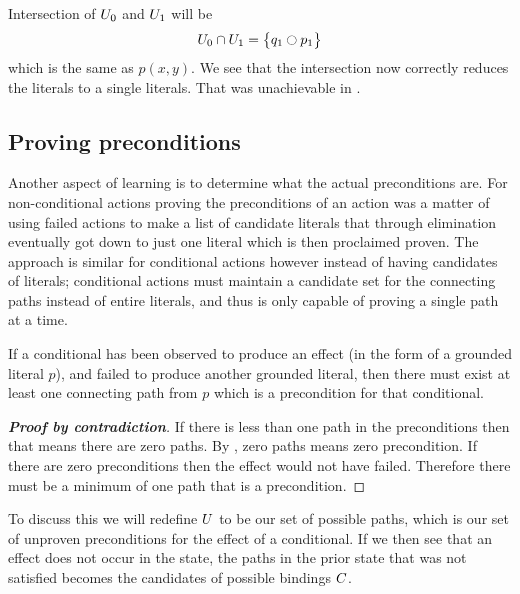\documentclass[\master/Master.tex]{subfiles}
\begin{document}
\begin{example}
   Intersection of $U_0$ and $U_1$ will be
	   \begin{align*}
	   	U_0 \cap U_1=
	   	\left\{
	   	\begin{gathered}
	   		q_1 \ocircle p_1 
	   	\end{gathered}	
	   	\right\}	
	   \end{align*}
   which is the same as $p(x,y)$. We see that the intersection now correctly reduces the literals to a single literals.
   That was unachievable in .
   
   
   
   
\end{example}

\subsection{Proving preconditions}
Another aspect of learning is to determine what the actual preconditions are.
For non-conditional actions proving the preconditions of an action was a matter of using failed actions to make a list of candidate literals that through elimination eventually got down to just one literal which is then proclaimed proven. The approach is similar for conditional actions however instead of having candidates of literals; conditional actions must maintain a candidate set for the connecting paths instead of entire literals, and thus is only capable of proving a single path at a time.

\begin{theorem}\label{thm:minimum-one-binding}
    If a conditional has been observed to produce an effect (in the form of a grounded literal $p$), and failed to produce another grounded literal, then there must exist at least one connecting path from $p$ which is a precondition for that conditional.
\end{theorem}

\begin{proof}[\textbf{Proof by contradiction}] 
    If there is less than one path in the preconditions then that means there are zero paths. By , zero paths means zero precondition. If there are zero preconditions then the effect would not have failed. Therefore there must be a minimum of one path that is a precondition.
\end{proof}

To discuss this we will redefine $U$ to be our set of possible paths, which is our set of unproven preconditions for the effect of a conditional.
If we then see that an effect does not occur in the state, the paths in the prior state that was not satisfied becomes the candidates of possible bindings $C$. 
\end{document}
